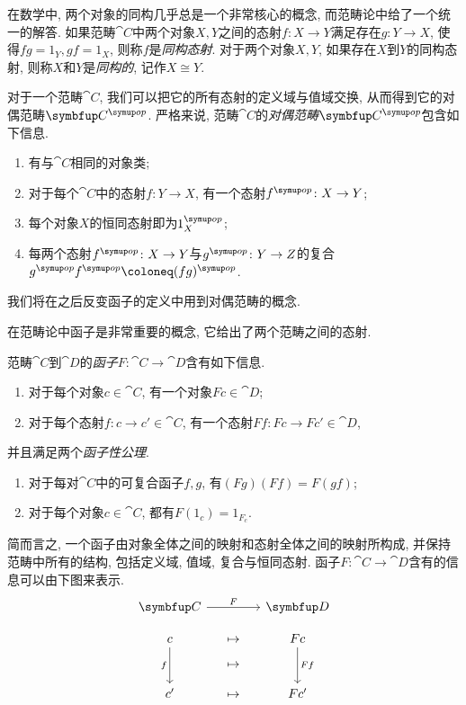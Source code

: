 在数学中, 两个对象的同构几乎总是一个非常核心的概念, 而范畴论中给了一个统一的解答. 如果范畴$\cat{C}$中两个对象$X, Y$之间的态射$f\colon X\to Y$满足存在$g\colon Y\to X$, 使得$fg=1_Y, gf=1_X$, 则称$f$是\emph{同构态射}. 对于两个对象$X, Y$, 如果存在$X$到$Y$的同构态射, 则称$X$和$Y$是\emph{同构的}, 记作$X\cong Y$.

对于一个范畴$\cat{C}$, 我们可以把它的所有态射的定义域与值域交换, 从而得到它的对偶范畴$\cat{C}^{\op}$. 严格来说, 范畴$\cat{C}$的\emph{对偶范畴}$\cat{C}^{\op}$包含如下信息.
\begin{enumerate}
  \item 有与$\cat{C}$相同的对象类;
  \item 对于每个$\cat{C}$中的态射$f\colon Y\to X$, 有一个态射$f^{\op}\colon X\to Y$;
  \item 每个对象$X$的恒同态射即为$1_X^{\op}$;
  \item 每两个态射$f^{\op}\colon X\to Y$与$g^{\op}\colon Y\to Z$的复合$g^{\op}f^{\op}\coloneq (fg)^{\op}$.
\end{enumerate}
我们将在之后反变函子的定义中用到对偶范畴的概念.

在范畴论中函子是非常重要的概念, 它给出了两个范畴之间的态射.

范畴$\cat{C}$到$\cat{D}$的\emph{函子}$F\colon \cat{C}\to \cat{D}$含有如下信息.
\begin{enumerate}
  \item 对于每个对象$c\in\cat{C}$, 有一个对象$Fc\in \cat{D}$;
  \item 对于每个态射$f\colon c\to c'\in\cat{C}$, 有一个态射$Ff\colon Fc\to Fc'\in\cat{D}$,
\end{enumerate}
并且满足两个\emph{函子性公理}.
\begin{enumerate}
  \item 对于每对$\cat{C}$中的可复合函子$f, g$, 有$(Fg)(Ff)=F(gf)$;
  \item 对于每个对象$c\in\cat{C}$, 都有$F(1_c)=1_{F_c}$.
\end{enumerate}
简而言之, 一个函子由对象全体之间的映射和态射全体之间的映射所构成, 并保持范畴中所有的结构, 包括定义域, 值域, 复合与恒同态射. 函子$F\colon \cat{C}\to \cat{D}$含有的信息可以由下图来表示.
\begin{equation}
  \functordiagram{\cat{C}}{\cat{D}}{F}{c}{c'}{f}{Fc}{Fc'}{Ff}
\end{equation}


